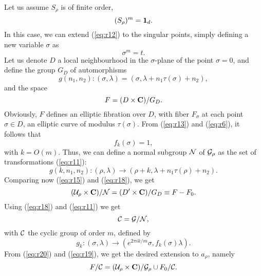 Let us assume $S_{\rho}$ is of finite order,
\begin{equation}
(S_{\rho})^m = {\bf 1}_d.
\label{eq:r13}
\end{equation}
In this case, we can extend (\ref{eq:r12}) to the singular
points, simply defining a new variable $\sigma$ as
\begin{equation}
\sigma^m = t.
\label{eq:r14}
\end{equation}
Let us denote $D$ a local neighbourhood in the $\sigma$-plane of
the point $\sigma=0$, and define the group $G_D$ of automorphisms
\begin{equation}
g(n_1,n_2):(\sigma,\lambda) = (\sigma,\lambda+n_1
\tau(\sigma)+n_2),
\label{eq:r15}
\end{equation}
and the space
\begin{equation}
F=(D \times {\bf C})/G_D.
\label{eq:r16}
\end{equation}
Obviously, $F$ defines an elliptic fibration over $D$, with fiber
$F_{\sigma}$ at each point $\sigma \in D$, an elliptic curve of
modulus $\tau(\sigma)$. From (\ref{eq:r13}) and (\ref{eq:r6}), it
follows that
\begin{equation}
f_k(\sigma) = 1,
\label{eq:r17}
\end{equation}
with $k=O(m)$. Thus, we can define a normal subgroup ${\cal N}$
of ${\cal G}_{\rho}$ as the set of transformations
(\ref{eq:r11}):
\begin{equation}
g(k,n_1,n_2):(\rho,\lambda) \rightarrow (\rho+k,\lambda+n_1
\tau(\rho)+n_2).
\label{eq:r18}
\end{equation}
Comparing now (\ref{eq:r15}) and (\ref{eq:r18}), we get
\begin{equation}
({\cal U}_{\rho} \times {\bf C})/{\cal N} = (D' \times {\bf
C})/G_D \equiv F-F_0.
\label{eq:r19}
\end{equation}
Using (\ref{eq:r18}) and (\ref{eq:r11}) we get
\begin{equation}
{\cal C} = {\cal G}/{\cal N},
\label{eq:r20}
\end{equation}
with ${\cal C}$ the cyclic group of order $m$, defined by
\begin{equation}
g_k:(\sigma,\lambda) \rightarrow (e^{2 \pi i k/m} \sigma,
f_k(\sigma) \lambda).
\label{eq:r21}
\end{equation}
From (\ref{eq:r20}) and (\ref{eq:r19}), we get the desired
extension to $a_{\rho}$, namely
\begin{equation}
F/{\cal C} = ({\cal U}_{\rho} \times {\bf C})/{\cal G}_{\rho}
\cup F_0/{\cal C}.
\label{eq:r22}
\end{equation}
